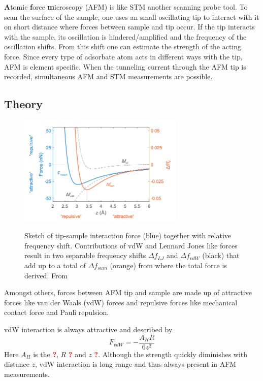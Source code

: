 \textbf{A}tomic \textbf{f}orce \textbf{m}icroscopy (AFM) is like STM another scanning probe tool. To scan the surface of the sample, one uses an small oscillating tip to interact with it on short distance where forces between sample and tip occur. If the tip interacts with the sample, its oscillation is hindered/amplified and the frequency of the oscillation shifts. 
From this shift one can estimate the strength of the acting force. Since every type of adsorbate atom acts in different ways with the tip, AFM is element specific. When the tunneling current through the AFM tip is recorded, simultaneous AFM and STM measurements are possible. 
\subsection{Theory}

\begin{figure}\centering
	\includegraphics[width=0.7\textwidth]{./images/AFM-graph-martin}
		\label{fig:AFM-force}
\caption{Sketch of tip-sample interaction force (blue) together with relative frequency shift. Contributions of vdW and Lennard Jones like forces result in two separable frequency shifts $\Delta f_{LJ}$ and $\Delta f_{vdW}$ (black) that add up to a total of $\Delta f_{sum}$ (orange) from where the total force is derived. From \cite{schwarz_assembly_2018}}
\label{fig:AFM-sketch}%
\end{figure}

Amongst others, forces between AFM tip and sample are made up of attractive forces like van der Waals (vdW) forces and repulsive forces like mechanical contact force and Pauli repulsion.

vdW interaction is always attractive and described by
\begin{equation} \label{eq:vdW}
F_{vdW} = - \frac{A_H R}{6z^2}
\end{equation}
Here $A_H$ is the \textcolor{red}{\textbf{?}}, $R$ \textcolor{red}{\textbf{?}} and $z$ \textcolor{red}{\textbf{?}}. Although the strength quickly diminishes with distance $z$, vdW interaction is long range and thus always present in AFM measurements.

